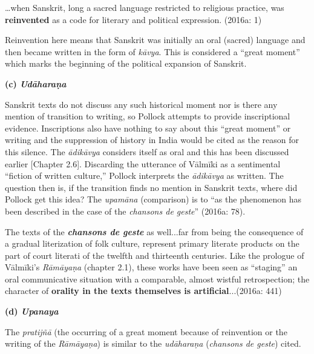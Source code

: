 \begin{myquote}
…when Sanskrit, long a sacred language restricted to religious practice, was \textbf{reinvented} as a code for literary and political expression. (2016a: 1)
\end{myquote}

Reinvention here means that Sanskrit was initially an oral (sacred) language and then became written in the form of \textit{kāvya}. This is considered a “great moment” which marks the beginning of the political expansion of Sanskrit.

\textbf{(c) \textit{Udāharaṇa}}

Sanskrit texts do not discuss any such historical moment nor is there any mention of transition to writing, so Pollock attempts to provide inscriptional evidence. Inscriptions also have nothing to say about this “great moment” or writing and the suppression of history in India would be cited as the reason for this silence. The \textit{ādikāvya }considers itself as oral and this has been discussed earlier [Chapter 2.6]. Discarding the utterance of Vālmīki as a sentimental “ﬁction of written culture,” Pollock interprets the \textit{ādikāvya }as written. The question then is, if the transition finds no mention in Sanskrit texts, where did Pollock get this idea? The \textit{upamāna} (comparison) is to “as the phenomenon has been described in the case of the \textit{chansons de geste}” (2016a: 78).

\begin{myquote}
The texts of the \textit{\textbf{chansons de geste}} as well...far from being the consequence of a gradual literization of folk culture, represent primary literate products on the part of court literati of the twelfth and thirteenth centuries. Like the prologue of Vālmīki’s \textit{Rāmāyaṇa} (chapter 2.1), these works have been seen as “staging” an oral communicative situation with a comparable, almost wistful retrospection; the character of \textbf{orality in the texts themselves is artiﬁcial}...(2016a: 441)
\end{myquote}

\newpage

\textbf{(d) \textit{Upanaya}}

The \textit{pratijñā }(the occurring of a great moment because of reinvention or the writing of the \textit{Rāmāyaṇa}) is similar to the \textit{udāharaṇa} (\textit{chansons de geste}) cited.

